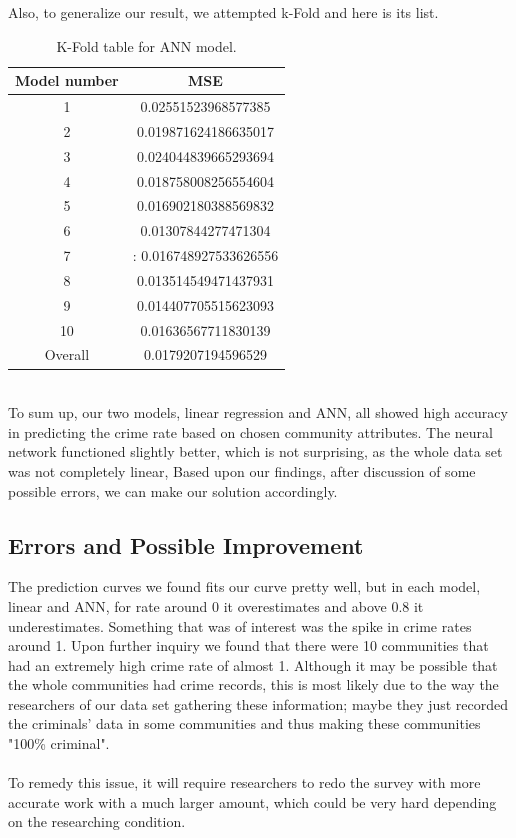 \documentclass[letterpaper, 11 pt, conference]{article}
\begin{document}
Also, to generalize our result, we attempted k-Fold and here is its list.


\begin{table}[H]
\centering
\begin{tabular}{ |c|c| } 
Model number & MSE \\\hline
1& 0.02551523968577385
\\2&0.019871624186635017
\\3&0.024044839665293694
\\4&0.018758008256554604
\\5& 0.016902180388569832
\\6& 0.01307844277471304
\\7&: 0.016748927533626556
\\8& 0.013514549471437931
\\9& 0.014407705515623093
\\10& 0.01636567711830139
\\Overall & 0.0179207194596529
\end{tabular}
\caption{\label{tab:widgets}K-Fold table for ANN model.}
\end{table}
\hspace*{\fill} \\

To sum up, our two models, linear regression and ANN, all showed high accuracy in predicting the crime rate based on chosen community attributes. The neural network functioned slightly better, which is not surprising, as the whole data set was not completely linear, Based upon our findings, after discussion of some possible errors, we can make our solution accordingly. 


\subsection{Errors and Possible Improvement}
The prediction curves we found fits our curve pretty  well, but in each model, linear and ANN, for rate around 0 it overestimates and above 0.8 it underestimates. Something that was of interest was the spike in crime rates around 1. Upon further inquiry we found that there were 10 communities that had an extremely high crime rate of almost 1. Although it may be possible that the whole communities had crime records, this is most likely due to the way the researchers of our data set gathering these information; maybe they just recorded the criminals' data in some communities and thus making these communities "100\% criminal".
\\\\To remedy this issue, it will require researchers to redo the survey with more accurate work with a much larger amount,  which could be very hard depending on the researching condition.
\end{document}

